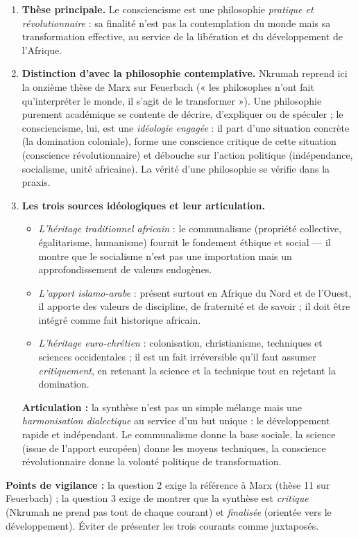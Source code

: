 \documentclass[11pt]{article}
\begin{document}
\begin{corrige}
\begin{enumerate}
\item \textbf{Thèse principale.} Le consciencisme est une philosophie \emph{pratique et révolutionnaire} : sa finalité n'est pas la contemplation du monde mais sa transformation effective, au service de la libération et du développement de l'Afrique.
\item \textbf{Distinction d'avec la philosophie contemplative.} Nkrumah reprend ici la onzième thèse de Marx sur Feuerbach (« les philosophes n'ont fait qu'interpréter le monde, il s'agit de le transformer »). Une philosophie purement académique se contente de décrire, d'expliquer ou de spéculer ; le consciencisme, lui, est une \emph{idéologie engagée} : il part d'une situation concrète (la domination coloniale), forme une conscience critique de cette situation (conscience révolutionnaire) et débouche sur l'action politique (indépendance, socialisme, unité africaine). La vérité d'une philosophie se vérifie dans la praxis.
\item \textbf{Les trois sources idéologiques et leur articulation.}
\begin{itemize}
\item \emph{L'héritage traditionnel africain} : le communalisme (propriété collective, égalitarisme, humanisme) fournit le fondement éthique et social — il montre que le socialisme n'est pas une importation mais un approfondissement de valeurs endogènes.
\item \emph{L'apport islamo-arabe} : présent surtout en Afrique du Nord et de l'Ouest, il apporte des valeurs de discipline, de fraternité et de savoir ; il doit être intégré comme fait historique africain.
\item \emph{L'héritage euro-chrétien} : colonisation, christianisme, techniques et sciences occidentales ; il est un fait irréversible qu'il faut assumer \emph{critiquement}, en retenant la science et la technique tout en rejetant la domination.
\end{itemize}
\textbf{Articulation :} la synthèse n'est pas un simple mélange mais une \emph{harmonisation dialectique} au service d'un but unique : le développement rapide et indépendant. Le communalisme donne la base sociale, la science (issue de l'apport européen) donne les moyens techniques, la conscience révolutionnaire donne la volonté politique de transformation.
\end{enumerate}

\textbf{Points de vigilance :} la question 2 exige la référence à Marx (thèse 11 sur Feuerbach) ; la question 3 exige de montrer que la synthèse est \emph{critique} (Nkrumah ne prend pas tout de chaque courant) et \emph{finalisée} (orientée vers le développement). Éviter de présenter les trois courants comme juxtaposés.
\end{corrige}
\end{document}
